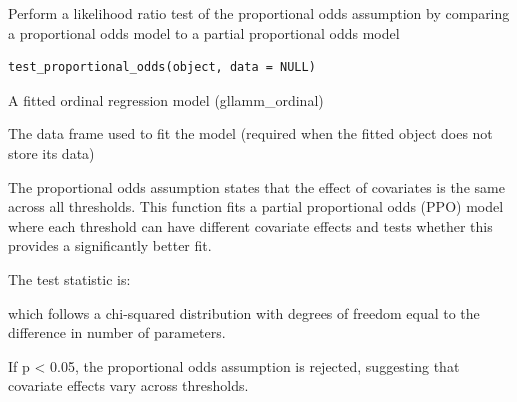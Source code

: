 \documentclass[a4paper]{book}
\begin{document}
%
\begin{Examples}
\end{Examples}
%
\begin{Description}
Perform a likelihood ratio test of the proportional odds assumption
by comparing a proportional odds model to a partial proportional odds model
\end{Description}
%
\begin{Usage}
\begin{verbatim}
test_proportional_odds(object, data = NULL)
\end{verbatim}
\end{Usage}
%
\begin{Arguments}
\begin{ldescription}
\item[\code{object}] A fitted ordinal regression model (gllamm\_ordinal)

\item[\code{data}] The data frame used to fit the model (required when the
fitted object does not store its data)
\end{ldescription}
\end{Arguments}
%
\begin{Details}
The proportional odds assumption states that the effect of covariates
is the same across all thresholds. This function fits a partial proportional
odds (PPO) model where each threshold can have different covariate effects
and tests whether this provides a significantly better fit.

The test statistic is:

which follows a chi-squared distribution with degrees of freedom equal to
the difference in number of parameters.

If p < 0.05, the proportional odds assumption is rejected, suggesting
that covariate effects vary across thresholds.
\end{Details}
\end{document}

